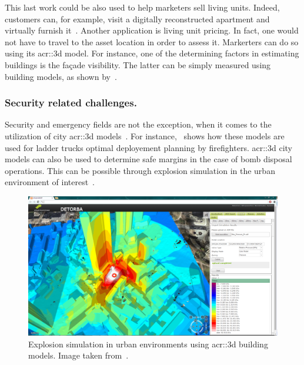             This last work could be also used to help marketers sell living units.
            Indeed, customers can, for example, visit a digitally reconstructed apartment and virtually furnish it~\parencite{kim2019planar}.
            Another application is living unit pricing.
            In fact, one would not have to travel to the asset location in order to assess it.
            Markerters can do so using its \gls{acr::3d} model.
            For instance, one of the determining factors in estimating buildings is the fa\c{c}ade visibility.
            The latter can be simply measured using building models, as shown by~\textcite{albrecht2013assessing}.

        \subsubsection{Security related challenges.}
            Security and emergency fields are not the exception, when it comes to the utilization of city \gls{acr::3d} models~\parencite{kwan2005emergency, ruppel2011designing}.
            For instance,~\textcite{chen2014application} shows how these models are used for ladder trucks optimal deployement planning by firefighters.
            \gls{acr::3d} city models can also be used to determine safe margins in the case of bomb disposal operations.
            This can be possible through explosion simulation in the urban environment of interest~\parencite{willenborg2015simulation}.\\
            \begin{figure}[htb]
                \centering
                \includegraphics[width=\textwidth]{images/introduction/3d_model_applications/explosion_simulation}            
                \caption[
                    Explosion simulation in urban environments using \acrshort*{acr::3d} building models.
                ]{
                    \label{fig::explosion_simulation}
                    Explosion simulation in urban environments using \gls{acr::3d} building models.
                    Image taken from~\parencite{biljecki2015applications}.
                }
            \end{figure}
